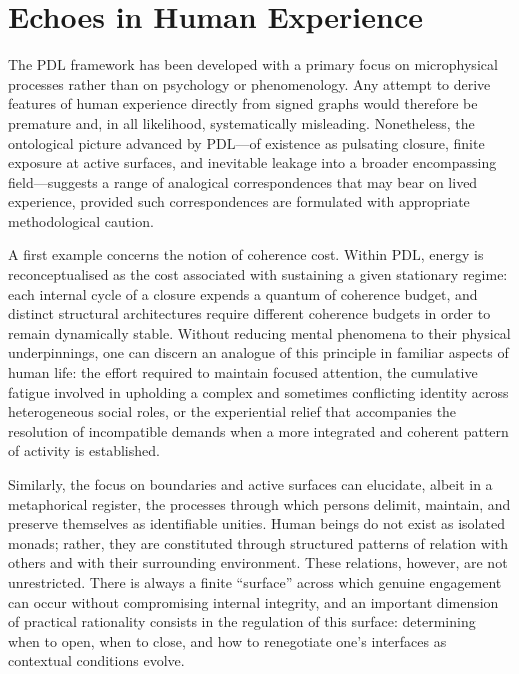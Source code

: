 \documentclass{article}
\theoremstyle{definition}
\newcommand{\PDL}{\ensuremath{\mathrm{PDL}}}
\begin{document}
\section{Echoes in Human Experience}
\label{sec:human_experience}

The \PDL{} framework has been developed with a primary focus on microphysical processes rather than on psychology or phenomenology. Any attempt to derive features of human experience directly from signed graphs would therefore be premature and, in all likelihood, systematically misleading. Nonetheless, the ontological picture advanced by \PDL{}—of existence as pulsating closure, finite exposure at active surfaces, and inevitable leakage into a broader encompassing field—suggests a range of analogical correspondences that may bear on lived experience, provided such correspondences are formulated with appropriate methodological caution.%
\cite{PDL_Position_2026}

A first example concerns the notion of coherence cost. Within \PDL{}, energy is reconceptualised as the cost associated with sustaining a given stationary regime: each internal cycle of a closure expends a quantum of coherence budget, and distinct structural architectures require different coherence budgets in order to remain dynamically stable.%
\cite{PDL_Main_2026}
Without reducing mental phenomena to their physical underpinnings, one can discern an analogue of this principle in familiar aspects of human life: the effort required to maintain focused attention, the cumulative fatigue involved in upholding a complex and sometimes conflicting identity across heterogeneous social roles, or the experiential relief that accompanies the resolution of incompatible demands when a more integrated and coherent pattern of activity is established.

Similarly, the focus on boundaries and active surfaces can elucidate, albeit in a metaphorical register, the processes through which persons delimit, maintain, and preserve themselves as identifiable unities.
Human beings do not exist as isolated monads; rather, they are constituted through structured patterns of relation with others and with their surrounding environment.
These relations, however, are not unrestricted.
There is always a finite “surface” across which genuine engagement can occur without compromising internal integrity, and an important dimension of practical rationality consists in the regulation of this surface: determining when to open, when to close, and how to renegotiate one’s interfaces as contextual conditions evolve.
\end{document}
